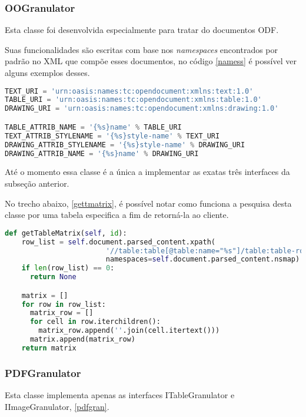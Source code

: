 \subsubsection{OOGranulator}

Esta classe foi desenvolvida especialmente para tratar do documentos ODF.

Suas funcionalidades são escritas com base nos \textit{namespaces} encontrados por padrão no XML que compõe esses documentos, no código \ref{namess} é possível ver alguns exemplos desses.

{\singlespace
\begin{lstlisting}[caption=URI e ODF Namespaces,language=python,label={namess}]
TEXT_URI = 'urn:oasis:names:tc:opendocument:xmlns:text:1.0'
TABLE_URI = 'urn:oasis:names:tc:opendocument:xmlns:table:1.0'
DRAWING_URI = 'urn:oasis:names:tc:opendocument:xmlns:drawing:1.0'

TABLE_ATTRIB_NAME = '{%s}name' % TABLE_URI
TEXT_ATTRIB_STYLENAME = '{%s}style-name' % TEXT_URI
DRAWING_ATTRIB_STYLENAME = '{%s}style-name' % DRAWING_URI
DRAWING_ATTRIB_NAME = '{%s}name' % DRAWING_URI
\end{lstlisting}
}

Até o momento essa classe é a única a implementar as exatas três interfaces da subseção anterior.

No trecho abaixo, \ref{gettmatrix}, é possível notar como funciona a pesquisa desta classe por uma tabela especifica a fim de retorná-la ao cliente.

{\singlespace
\begin{lstlisting}[caption=Método de getTableMatrix,language=python,label={gettmatrix}]
  def getTableMatrix(self, id):
    row_list = self.document.parsed_content.xpath(
                        '//table:table[@table:name="%s"]/table:table-row' % id,
                        namespaces=self.document.parsed_content.nsmap)
    if len(row_list) == 0:
      return None

    matrix = []
    for row in row_list:
      matrix_row = []
      for cell in row.iterchildren():
        matrix_row.append(''.join(cell.itertext()))
      matrix.append(matrix_row)
    return matrix
\end{lstlisting}
}


\subsubsection{PDFGranulator}

Esta classe implementa apenas as interfaces ITableGranulator e IImageGranulator, \ref{pdfgran}.

